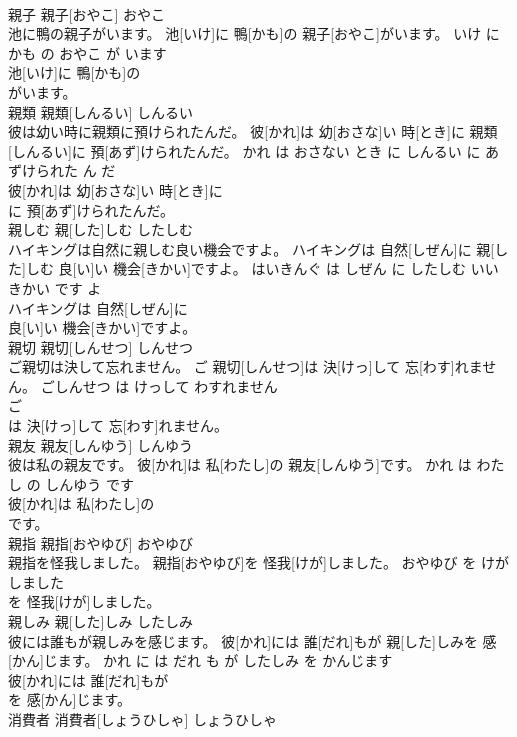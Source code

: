 \documentclass[8pt]{extreport}
\begin{document}
\begin{CJK}{UTF8}{min}
\\	親子	親子[おやこ]	おやこ	
\\	池に鴨の親子がいます。	池[いけ]に 鴨[かも]の 親子[おやこ]がいます。	いけ に かも の おやこ が います	
\\	池[いけ]に 鴨[かも]の
\\	がいます。			
\\	親類	親類[しんるい]	しんるい	
\\	彼は幼い時に親類に預けられたんだ。	彼[かれ]は 幼[おさな]い 時[とき]に 親類[しんるい]に 預[あず]けられたんだ。	かれ は おさない とき に しんるい に あずけられた ん だ	
\\	彼[かれ]は 幼[おさな]い 時[とき]に
\\	に 預[あず]けられたんだ。			
\\	親しむ	親[した]しむ	したしむ	
\\	ハイキングは自然に親しむ良い機会ですよ。	ハイキングは 自然[しぜん]に 親[した]しむ 良[い]い 機会[きかい]ですよ。	はいきんぐ は しぜん に したしむ いい きかい です よ	
\\	ハイキングは 自然[しぜん]に
\\	良[い]い 機会[きかい]ですよ。			
\\	親切	親切[しんせつ]	しんせつ	
\\	ご親切は決して忘れません。	ご 親切[しんせつ]は 決[けっ]して 忘[わす]れません。	ごしんせつ は けっして わすれません	
\\	ご
\\	は 決[けっ]して 忘[わす]れません。			
\\	親友	親友[しんゆう]	しんゆう	
\\	彼は私の親友です。	彼[かれ]は 私[わたし]の 親友[しんゆう]です。	かれ は わたし の しんゆう です	
\\	彼[かれ]は 私[わたし]の
\\	です。			
\\	親指	親指[おやゆび]	おやゆび	
\\	親指を怪我しました。	親指[おやゆび]を 怪我[けが]しました。	おやゆび を けがしました	
\\	を 怪我[けが]しました。			
\\	親しみ	親[した]しみ	したしみ	
\\	彼には誰もが親しみを感じます。	彼[かれ]には 誰[だれ]もが 親[した]しみを 感[かん]じます。	かれ に は だれ も が したしみ を かんじます	
\\	彼[かれ]には 誰[だれ]もが
\\	を 感[かん]じます。			
\\	消費者	消費者[しょうひしゃ]	しょうひしゃ	

\end{CJK}
\end{document}
